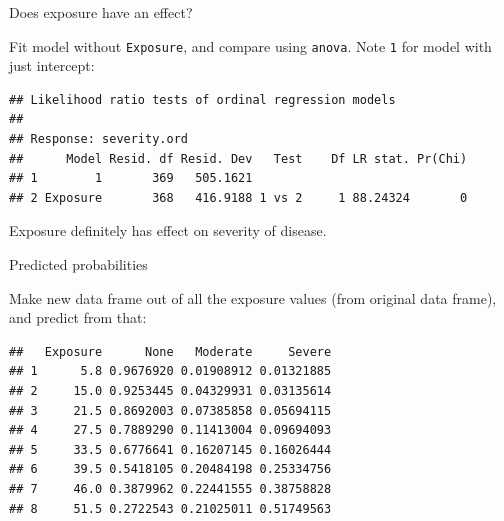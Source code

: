 \begin{frame}[fragile]{Does exposure have an effect?}
  
  Fit model without \texttt{Exposure}, and compare
using \texttt{anova}. Note \texttt{1} for model with just intercept:

{\small
\begin{knitrout}
\color{fgcolor}\begin{kframe}
\begin{alltt}
\hlkwb{=}\hlopt{~}\hlstd{,}
\end{alltt}
\begin{verbatim}
## Likelihood ratio tests of ordinal regression models
## 
## Response: severity.ord
##      Model Resid. df Resid. Dev   Test    Df LR stat. Pr(Chi)
## 1        1       369   505.1621                              
## 2 Exposure       368   416.9188 1 vs 2     1 88.24324       0
\end{verbatim}
\end{kframe}
\end{knitrout}
} 


Exposure definitely has effect on severity of disease. 

  
\end{frame}

\begin{frame}[fragile]{Predicted probabilities}

Make new data frame out of all the exposure values (from original data
frame), and predict from that:

 
\begin{knitrout}
\color{fgcolor}\begin{kframe}
\begin{alltt}
\hlkwb{=}\hlstd{(}\hlopt{$}
\hlkwb{=}\hlstd{=}\hlstd{)}
\hlkwb{=}
\end{alltt}
\begin{verbatim}
##   Exposure      None   Moderate     Severe
## 1      5.8 0.9676920 0.01908912 0.01321885
## 2     15.0 0.9253445 0.04329931 0.03135614
## 3     21.5 0.8692003 0.07385858 0.05694115
## 4     27.5 0.7889290 0.11413004 0.09694093
## 5     33.5 0.6776641 0.16207145 0.16026444
## 6     39.5 0.5418105 0.20484198 0.25334756
## 7     46.0 0.3879962 0.22441555 0.38758828
## 8     51.5 0.2722543 0.21025011 0.51749563
\end{verbatim}
\end{kframe}
\end{knitrout}
 
  
\end{frame}


